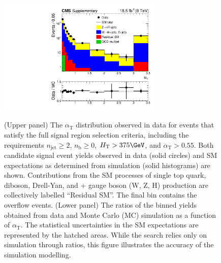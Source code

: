 \clearpage
\begin{figure}[h!]
  \begin{center}
    \includegraphics[width=0.7\textwidth]{AlphaT} \\
    \caption{ (Upper panel) The $\alpha_\text{T}$ distribution
      observed in data for events that satisfy the full signal region
      selection criteria, including the requirements $n_\text{jet}
      \geq 2$, $n_\text{b} \geq 0$, $H_\text{T} > 375\GeV$, and
      $\alpha_\text{T} > 0.55$. Both candidate signal event yields
      observed in data (solid circles) and SM expectations as
      determined from simulation (solid histograms) are
      shown. Contributions from the SM processes of single top quark,
      diboson, Drell-Yan, and \ttbar + gauge boson (W, Z, H)
      production are collectively labelled ``Residual SM''. The final
      bin contains the overflow events.  (Lower panel) The ratios of
      the binned yields obtained from data and Monte Carlo (MC)
      simulation as a function of $\alpha_\text{T}$. The statistical
      uncertainties in the SM expectations are represented by the
      hatched areas. While the search relies only on simulation
      through ratios, this figure illustrates the accuracy of the
      simulation modelling. }
  \end{center}
\end{figure}

